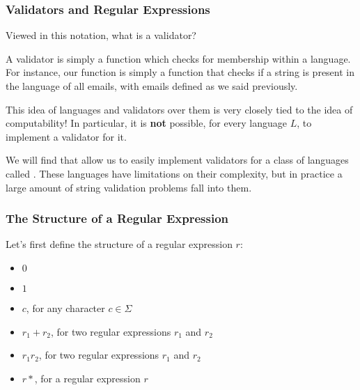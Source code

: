 \documentclass[aspectratio=169]{beamer}
\begin{document}
\begin{frame}[fragile]
  \frametitle{Validators and Regular Expressions}

  Viewed in this notation, what is a validator?

  A validator is simply a function which checks for membership within a
  language. For instance, our  function is simply a
  function that checks if a string is present in the language of all emails,
  with emails defined as we said previously.

  
  This idea of languages and validators over them is very closely tied to
  the idea of computability! In particular, it is \textbf{not} possible, 
  for every language $L$, to implement a validator for it. \footnotemark 

  We will find that  allow us to easily implement
  validators for a class of languages called . These
  languages have limitations on their complexity, but in practice a large amount
  of string validation problems fall into them. 

\end{frame}

\begin{frame}[fragile]
  \frametitle{The Structure of a Regular Expression}

  Let's first define the structure of a regular expression $r$:

  \begin{itemize}
    \item $0$
    \item $1$
    \item $c$, for any character $c \in \Sigma$
    \item $r_1 + r_2$, for two regular expressions $r_1$ and $r_2$
    \item $r_1r_2$, for two regular expressions $r_1$ and $r_2$
    \item $r*$, for a regular expression $r$
  \end{itemize}
\end{frame}
\end{document}
